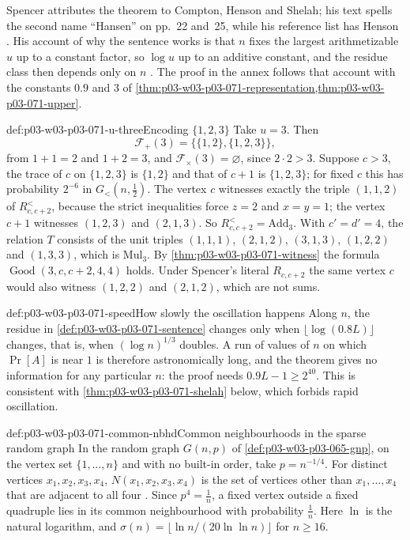Spencer attributes the theorem to Compton, Henson and Shelah; his text
spells the second name ``Hansen'' on pp.~22 and~25, while his reference list
has Henson \cite[pp.~22, 28]{Spencer2007LogicRandomStructuresAuthor}.  His
account of why the sentence works is that \(n\) fixes the largest
arithmetizable \(u\) up to a constant factor, so \(\log u\) up to an
additive constant, and the residue class then depends only on \(n\)
\cite[pp.~23--24]{Spencer2007LogicRandomStructuresAuthor}.  The proof in the
annex follows that account with the constants \(0.9\) and \(3\) of
\cref{thm:p03-w03-p03-071-representation,thm:p03-w03-p03-071-upper}.

\begin{hbexample}{def:p03-w03-p03-071-u-three}{Encoding \(\{1,2,3\}\)}
Take \(u=3\).  Then
\[
 \mathcal F_+(3)=\{\{1,2\},\{1,2,3\}\},
\]
from \(1+1=2\) and \(1+2=3\), and \(\mathcal F_\times(3)=\varnothing\), since
\(2\cdot2>3\).  Suppose \(c>3\), the trace of \(c\) on \(\{1,2,3\}\) is
\(\{1,2\}\) and that of \(c+1\) is \(\{1,2,3\}\); for fixed \(c\) this has
probability \(2^{-6}\) in \(G_<(n,\frac12)\).  The vertex \(c\) witnesses
exactly the triple \((1,1,2)\) of \(R^<_{c,c+2}\), because the strict
inequalities force \(z=2\) and \(x=y=1\); the vertex \(c+1\) witnesses
\((1,2,3)\) and \((2,1,3)\).  So \(R^<_{c,c+2}=\mathrm{Add}_3\).  With
\(c'=d'=4\), the relation \(T\) consists of the unit triples
\((1,1,1)\), \((2,1,2)\), \((3,1,3)\), \((1,2,2)\) and \((1,3,3)\),
which is \(\mathrm{Mul}_3\).
By \cref{thm:p03-w03-p03-071-witness} the formula
\(\operatorname{Good}(3,c,c+2,4,4)\) holds.  Under Spencer's literal
\(R_{c,c+2}\) the same vertex \(c\) would also witness \((1,2,2)\) and
\((2,1,2)\), which are not sums.
\end{hbexample}

\begin{hbwarning}{def:p03-w03-p03-071-speed}{How slowly the oscillation happens}
Along \(n\), the residue in \cref{def:p03-w03-p03-071-sentence} changes only
when \(\lfloor\log(0.8L)\rfloor\) changes, that is, when \((\log n)^{1/3}\)
doubles.  A run of values of \(n\) on which \(\Pr[A]\) is near \(1\) is
therefore astronomically long, and the theorem gives no information for
any particular \(n\): the proof needs \(0.9L-1\geq2^{40}\).  This is
consistent with \cref{thm:p03-w03-p03-071-shelah} below, which forbids rapid
oscillation.
\end{hbwarning}

\begin{hbdefinition}{def:p03-w03-p03-071-common-nbhd}{Common neighbourhoods in the sparse random graph}
In the random graph \(G(n,p)\) of \cref{def:p03-w03-p03-065-gnp}, on the
vertex set \(\{1,\ldots,n\}\) and with no built-in order, take
\(p=n^{-1/4}\).  For distinct vertices \(x_1,x_2,x_3,x_4\),
\(N(x_1,x_2,x_3,x_4)\) is the set of vertices other than \(x_1,\ldots,x_4\)
that are adjacent to all four \cite[p.~24]{Spencer2007LogicRandomStructuresAuthor}.
Since \(p^4=\frac1n\), a fixed vertex outside a fixed quadruple lies in its
common neighbourhood with probability \(\frac1n\).  Here \(\ln\) is the
natural logarithm, and \(\sigma(n)=\lfloor\ln n/(20\ln\ln n)\rfloor\) for
\(n\geq16\).
\end{hbdefinition}

